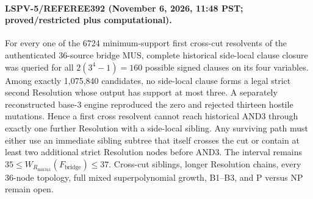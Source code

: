 \paragraph{LSPV-5/REFEREE392 (November 6, 2026, 11:48 PST; proved/restricted plus computational).}
For every one of the 6724 minimum-support first cross-cut resolvents of the authenticated 36-source bridge MUS, complete historical side-local clause closure was queried for all $2(3^4-1)=160$ possible signed clauses on its four variables.  Among exactly 1,075,840 candidates, no side-local clause forms a legal strict second Resolution whose output has support at most three.  A separately reconstructed base-3 engine reproduced the zero and rejected thirteen hostile mutations.  Hence a first cross resolvent cannot reach historical AND3 through exactly one further Resolution with a side-local sibling.  Any surviving path must either use an immediate sibling subtree that itself crosses the cut or contain at least two additional strict Resolution nodes before AND3.  The interval remains $35\le W_{R_{\mathrm{mix341}}}(F_{\mathrm{bridge}})\le37$.  Cross-cut siblings, longer Resolution chains, every 36-node topology, full mixed superpolynomial growth, B1--B3, and P versus NP remain open.
